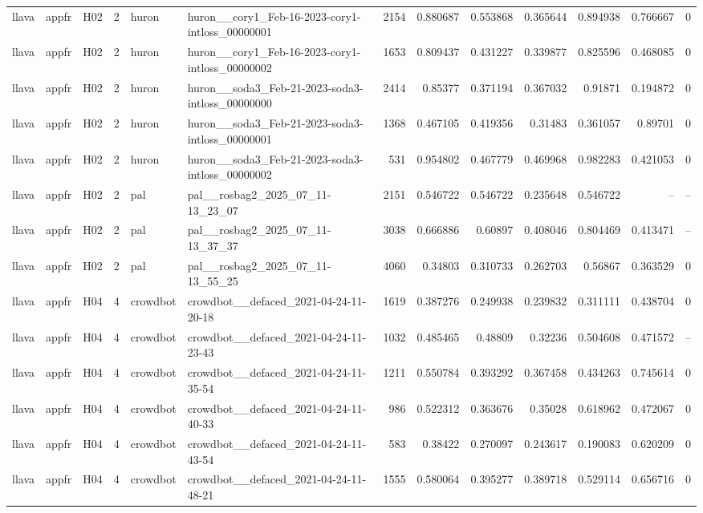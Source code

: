 \begin{longtable}{lllrllrrrrrrr}
llava & appfr & H02 & 2 & huron & huron\_\_cory1\_Feb-16-2023-cory1-intloss\_00000001 & 2154 & 0.880687 & 0.553868 & 0.365644 & 0.894938 & 0.766667 & 0 \\
llava & appfr & H02 & 2 & huron & huron\_\_cory1\_Feb-16-2023-cory1-intloss\_00000002 & 1653 & 0.809437 & 0.431227 & 0.339877 & 0.825596 & 0.468085 & 0 \\
llava & appfr & H02 & 2 & huron & huron\_\_soda3\_Feb-21-2023-soda3-intloss\_00000000 & 2414 & 0.85377 & 0.371194 & 0.367032 & 0.91871 & 0.194872 & 0 \\
llava & appfr & H02 & 2 & huron & huron\_\_soda3\_Feb-21-2023-soda3-intloss\_00000001 & 1368 & 0.467105 & 0.419356 & 0.31483 & 0.361057 & 0.89701 & 0 \\
llava & appfr & H02 & 2 & huron & huron\_\_soda3\_Feb-21-2023-soda3-intloss\_00000002 & 531 & 0.954802 & 0.467779 & 0.469968 & 0.982283 & 0.421053 & 0 \\
llava & appfr & H02 & 2 & pal & pal\_\_rosbag2\_2025\_07\_11-13\_23\_07 & 2151 & 0.546722 & 0.546722 & 0.235648 & 0.546722 & -- & -- \\
llava & appfr & H02 & 2 & pal & pal\_\_rosbag2\_2025\_07\_11-13\_37\_37 & 3038 & 0.666886 & 0.60897 & 0.408046 & 0.804469 & 0.413471 & -- \\
llava & appfr & H02 & 2 & pal & pal\_\_rosbag2\_2025\_07\_11-13\_55\_25 & 4060 & 0.34803 & 0.310733 & 0.262703 & 0.56867 & 0.363529 & 0 \\
llava & appfr & H04 & 4 & crowdbot & crowdbot\_\_defaced\_2021-04-24-11-20-18 & 1619 & 0.387276 & 0.249938 & 0.239832 & 0.311111 & 0.438704 & 0 \\
llava & appfr & H04 & 4 & crowdbot & crowdbot\_\_defaced\_2021-04-24-11-23-43 & 1032 & 0.485465 & 0.48809 & 0.32236 & 0.504608 & 0.471572 & -- \\
llava & appfr & H04 & 4 & crowdbot & crowdbot\_\_defaced\_2021-04-24-11-35-54 & 1211 & 0.550784 & 0.393292 & 0.367458 & 0.434263 & 0.745614 & 0 \\
llava & appfr & H04 & 4 & crowdbot & crowdbot\_\_defaced\_2021-04-24-11-40-33 & 986 & 0.522312 & 0.363676 & 0.35028 & 0.618962 & 0.472067 & 0 \\
llava & appfr & H04 & 4 & crowdbot & crowdbot\_\_defaced\_2021-04-24-11-43-54 & 583 & 0.38422 & 0.270097 & 0.243617 & 0.190083 & 0.620209 & 0 \\
llava & appfr & H04 & 4 & crowdbot & crowdbot\_\_defaced\_2021-04-24-11-48-21 & 1555 & 0.580064 & 0.395277 & 0.389718 & 0.529114 & 0.656716 & 0 \\

\end{longtable}
